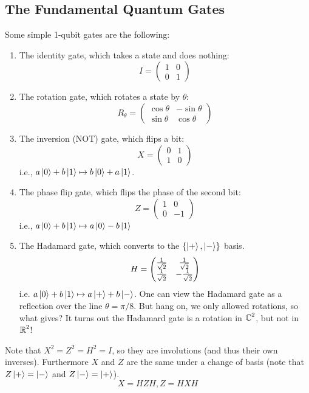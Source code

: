 \subsection{The Fundamental Quantum Gates}
Some simple 1-qubit gates are the following:
\begin{definition}
    \begin{enumerate}
        \item The identity gate, which takes a state and does nothing:
        \[ I = \begin{pmatrix}
           1 & 0 \\ 0 & 1 
        \end{pmatrix} \]
        \item The rotation gate, which rotates a state by $\theta$:
        \[ R_{\theta} = \begin{pmatrix} \cos\theta & -\sin\theta \\ \sin\theta & \cos\theta \end{pmatrix}\]
        \item The inversion (NOT) gate, which flips a bit:
        \[ X = \begin{pmatrix}
            0 & 1 \\ 1 & 0
        \end{pmatrix} \]
        i.e., $a \ket{0} + b \ket{1} \mapsto b \ket{0} + a \ket{1}$.
        \item The phase flip gate, which flips the phase of the second bit:
        \[ Z = \begin{pmatrix}
            1 & 0 \\ 0 & -1
        \end{pmatrix} \]
        i.e., $a \ket{0} + b \ket{1} \mapsto a \ket{0} - b\ket{1}$
        \item The Hadamard gate, which converts to the $\{\ket{+}, \ket{-}\}$ basis.
        \[ H = \begin{pmatrix}
            \frac{1}{\sqrt{2}} & \frac{1}{\sqrt{2}} \\ \frac{1}{\sqrt{2}} & -\frac{1}{\sqrt{2}}
        \end{pmatrix} \]
        i.e. $a \ket{0} + b \ket{1} \mapsto a \ket{+} + b \ket{-}$.
        One can view the Hadamard gate as a reflection over the line $\theta = \pi/8$. But hang on, we only allowed rotations, so what gives?
        It turns out the Hadamard gate is a rotation in $\operatorname{\mathbb{C}}^2$, but not in $\operatorname{\mathbb{R}}^2$!
    \end{enumerate}
    Note that $X^2 = Z^2 = H^2 = I$, so they are involutions (and thus their own inverses). Furthermore $X$ and $Z$ are the same under a change of basis (note that $Z\ket{+} = \ket{-}$ and $Z \ket{-} = \ket{+}$).
    \[ X = HZH, Z = HXH \]
\end{definition}

